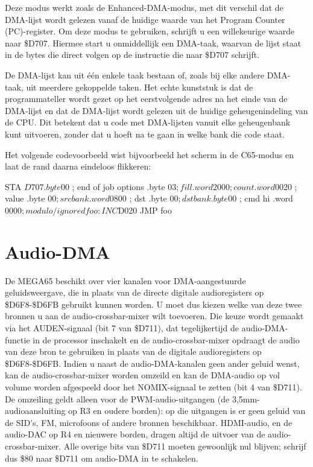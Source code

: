 Deze modus werkt zoals de Enhanced-DMA-modus, met dit verschil dat de DMA-lijst wordt gelezen vanaf de huidige waarde van het Program Counter (PC)-register. Om deze modus te gebruiken, schrijft u een willekeurige waarde naar \$D707. Hiermee start u onmiddellijk een DMA-taak, waarvan de lijst staat in de bytes die direct volgen op de instructie die naar \$D707 schrijft.

De DMA-lijst kan uit één enkele taak bestaan of, zoals bij elke andere DMA-taak, uit meerdere gekoppelde taken. Het echte kunststuk is dat de programmateller wordt gezet op het eerstvolgende adres na het einde van de DMA-lijst en dat de DMA-lijst wordt gelezen uit de huidige geheugenindeling van de CPU. Dit betekent dat u code met DMA-lijsten vanuit elke geheugenbank kunt uitvoeren, zonder dat u hoeft na te gaan in welke bank die code staat.

Het volgende codevoorbeeld wist bijvoorbeeld het scherm in de C65-modus en laat de rand daarna eindeloos flikkeren:

\begin{asmcodesmall}
  STA $D707
  .byte $00   ; end of job options
  .byte $03   ; fill
  .word 2000  ; count
  .word $0020 ; value
  .byte $00   ; src bank
  .word $0800 ; dst
  .byte $00   ; dst bank
  .byte $00   ; cmd hi
  .word $0000 ; modulo / ignored
foo:
  INC $D020
  JMP foo
\end{asmcodesmall}

\section{Audio-DMA}
De MEGA65 beschikt over vier kanalen voor DMA-aangestuurde geluidsweergave, die in plaats van de directe digitale audioregisters op \$D6F8-\$D6FB gebruikt kunnen worden. U moet dus kiezen welke van deze twee bronnen u aan de audio-crossbar-mixer wilt toevoeren. Die keuze wordt gemaakt via het AUDEN-signaal (bit 7 van \$D711), dat tegelijkertijd de audio-DMA-functie in de processor inschakelt en de audio-crossbar-mixer opdraagt de audio van deze bron te gebruiken in plaats van de digitale audioregisters op \$D6F8-\$D6FB. Indien u naast de audio-DMA-kanalen geen ander geluid wenst, kan de audio-crossbar-mixer worden omzeild en kan de DMA-audio op vol volume worden afgespeeld door het NOMIX-signaal te zetten (bit 4 van \$D711). De omzeiling geldt alleen voor de PWM-audio-uitgangen (de 3,5mm-audioaansluiting op R3 en oudere borden): op die uitgangen is er geen geluid van de SID's, FM, microfoons of andere bronnen beschikbaar. HDMI-audio, en de audio-DAC op R4 en nieuwere borden, dragen altijd de uitvoer van de audio-crossbar-mixer. Alle overige bits van \$D711 moeten gewoonlijk nul blijven; schrijf dus \$80 naar \$D711 om audio-DMA in te schakelen.

